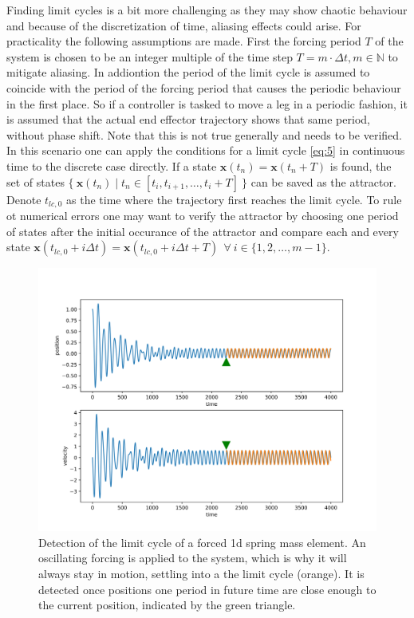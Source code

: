 Finding limit cycles is a bit more challenging as they may show chaotic behaviour and because of the discretization of time, aliasing effects could arise. For practicality the following assumptions are made. 
First the forcing period $T$ of the system is chosen to be an integer multiple of the time step $T = m\cdot \Delta t, m \in \mathbb{N}$ to mitigate aliasing. In addiontion the period of the limit cycle is assumed to coincide with the period of the forcing period that causes the periodic behaviour in the first place. So if a controller is tasked to move a leg in a periodic fashion, it is assumed that the actual end effector trajectory shows that same period, without phase shift. Note that this is not true generally and needs to be verified. 
In this scenario one can apply the conditions for a limit cycle \ref{eq:5} in continuous time to the discrete case directly.
If a state $\mathbf{x}(t_n) = \mathbf{x}(t_n+T)$ is found, the set of states $\{\ \mathbf{x}(t_n) \mid t_n \in [t_i,t_{i+1},\ldots,t_i+T]\ \}$ can be saved as the attractor. Denote $t_{lc,0}$ as the time where the trajectory first reaches the limit cycle. To rule ot numerical errors one may want to verify the attractor by choosing one period of states after the initial occurance of the attractor and compare each and every state $\mathbf{x}(t_{lc,0}+i\Delta t) = \mathbf{x}(t_{lc,0}+i\Delta t+T)\ \ \forall\ i \in \{1,2,\ldots, m-1\}$.

\begin{figure}[h]
\centering
\includegraphics[width=.7\textwidth]{figures/limit_cycle_detection.png}
\caption[Limit Cycle Detection]{Detection of the limit cycle of a forced 1d spring mass element. An oscillating forcing is applied to the system, which is why it will always stay in motion, settling into a the limit cycle (orange). It is detected once positions one period in future time are close enough to the current position, indicated by the green triangle.}
\label{lcdet}
\end{figure}

